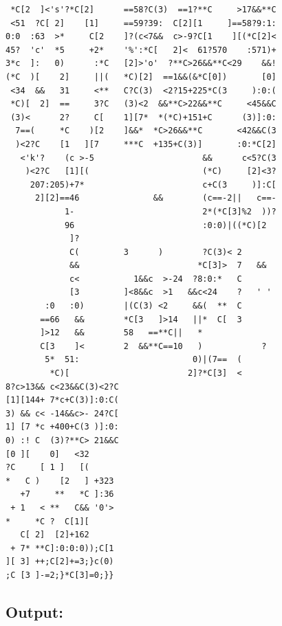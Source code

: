 \documentclass[11pt]{article}
\begin{document}
\begin{lstlisting}
 *C[2  ]<'s'?*C[2]      ==58?C(3)  ==1?**C     >17&&**C
 <51  ?C[ 2]    [1]     ==59?39:  C[2][1     ]==58?9:1:
0:0  :63  >*     C[2    ]?(c<7&&  c>-9?C[1    ][(*C[2]<
45?  'c'  *5     +2*    '%':*C[   2]<  61?570    :571)+
3*c  ]:   0)      :*C   [2]>'o'  ?**C>26&&**C<29    &&!
(*C  )[    2]     ||(   *C)[2]  ==1&&(&*C[0])       [0]
 <34  &&   31     <**   C?C(3)  <2?15+225*C(3     ):0:(
 *C)[  2]  ==     3?C   (3)<2  &&**C>22&&**C     <45&&C
 (3)<      2?     C[    1][7*  *(*C)+151+C      (3)]:0:
  7==(     *C    )[2    ]&&*  *C>26&&**C       <42&&C(3
  )<2?C    [1   ][7     ***C  +135+C(3)]       :0:*C[2]
   <'k'?    (c >-5                      &&      c<5?C(3
    )<2?C   [1][(                       (*C)     [2]<3?
     207:205)+7*                        c+C(3     )]:C[
      2][2]==46               &&        (c==-2||   c==-
            1-                          2*(*C[3]%2  ))?
            96                          :0:0)|((*C)[2  
             ]?                                        
             C(         3      )        ?C(3)< 2       
             &&                        *C[3]>  7   &&  
             c<           1&&c  >-24  ?8:0:*   C       
             [3         ]<8&&c  >1   &&c<24    ?   ' ' 
        :0   :0)        |(C(3) <2     &&(  **  C       
       ==66   &&        *C[3   ]>14   ||*  C[  3       
       ]>12   &&        58   ==**C||   *               
       C[3    ]<        2  &&**C==10   )            ?  
        5*  51:                       0)|(7==  (       
         *C)[                        2]?*C[3]  <       
8?c>13&& c<23&&C(3)<2?C
[1][144+ 7*c+C(3)]:0:C(
3) && c< -14&&c>- 24?C[
1] [7 *c +400+C(3 )]:0:
0) :! C  (3)?**C> 21&&C
[0 ][    0]   <32      
?C     [ 1 ]   [(      
*   C )    [2   ] +323 
   +7     **   *C ]:36 
 + 1   < **   C&& '0'> 
*     *C ?  C[1][      
   C[ 2]  [2]+162      
 + 7* **C]:0:0:0));C[1 
][ 3] ++;C[2]+=3;}c(0) 
;C [3 ]-=2;}*C[3]=0;}} 

\end{lstlisting}

\subsection*{Output:}
\end{document}
